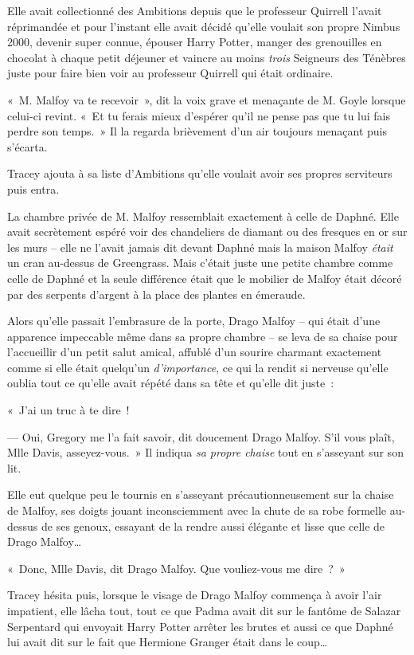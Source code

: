 Elle avait collectionné des Ambitions depuis que le professeur Quirrell l'avait réprimandée et pour l'instant elle avait décidé qu'elle voulait son propre Nimbus 2000, devenir super connue, épouser Harry Potter, manger des grenouilles en chocolat à chaque petit déjeuner et vaincre au moins \emph{trois} Seigneurs des Ténèbres juste pour faire bien voir au professeur Quirrell qui était ordinaire.

«~M. Malfoy va te recevoir~», dit la voix grave et menaçante de M. Goyle lorsque celui-ci revint. «~Et tu ferais mieux d'espérer qu'il ne pense pas que tu lui fais perdre son temps.~» Il la regarda brièvement d'un air toujours menaçant puis s'écarta.

Tracey ajouta à sa liste d'Ambitions qu'elle voulait avoir ses propres serviteurs puis entra.

La chambre privée de M. Malfoy ressemblait exactement à celle de Daphné. Elle avait secrètement espéré voir des chandeliers de diamant ou des fresques en or sur les murs -- elle ne l'avait jamais dit devant Daphné mais la maison Malfoy \emph{était} un cran au-dessus de Greengrass. Mais c'était juste une petite chambre comme celle de Daphné et la seule différence était que le mobilier de Malfoy était décoré par des serpents d'argent à la place des plantes en émeraude.

Alors qu'elle passait l'embrasure de la porte, Drago Malfoy -- qui était d'une apparence impeccable même dans sa propre chambre -- se leva de sa chaise pour l'accueillir d'un petit salut amical, affublé d'un sourire charmant exactement comme si elle était quelqu'un \emph{d'importance}, ce qui la rendit si nerveuse qu'elle oublia tout ce qu'elle avait répété dans sa tête et qu'elle dit juste~:

«~J'ai un truc à te dire~!

--- Oui, Gregory me l'a fait savoir, dit doucement Drago Malfoy. S'il vous plaît, Mlle Davis, asseyez-vous.~» Il indiqua \emph{sa propre chaise} tout en s'asseyant sur son lit.

Elle eut quelque peu le tournis en s'asseyant précautionneusement sur la chaise de Malfoy, ses doigts jouant inconsciemment avec la chute de sa robe formelle au-dessus de ses genoux, essayant de la rendre aussi élégante et lisse que celle de Drago Malfoy…

«~Donc, Mlle Davis, dit Drago Malfoy. Que vouliez-vous me dire~?~»

Tracey hésita puis, lorsque le visage de Drago Malfoy commença à avoir l'air impatient, elle lâcha tout, tout ce que Padma avait dit sur le fantôme de Salazar Serpentard qui envoyait Harry Potter arrêter les brutes et aussi ce que Daphné lui avait dit sur le fait que Hermione Granger était dans le coup…

